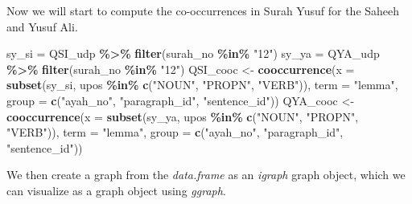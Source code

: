 \documentclass[
]{article}
\newenvironment{Shaded}{\begin{snugshade}}{\end{snugshade}}
\newcommand{\AttributeTok}[1]{\textcolor[rgb]{0.13,0.29,0.53}{#1}}
\newcommand{\FunctionTok}[1]{\textcolor[rgb]{0.13,0.29,0.53}{\textbf{#1}}}
\newcommand{\NormalTok}[1]{#1}
\newcommand{\OtherTok}[1]{\textcolor[rgb]{0.56,0.35,0.01}{#1}}
\newcommand{\SpecialCharTok}[1]{\textcolor[rgb]{0.81,0.36,0.00}{\textbf{#1}}}
\newcommand{\StringTok}[1]{\textcolor[rgb]{0.31,0.60,0.02}{#1}}
\begin{document}
Now we will start to compute the co-occurrences in Surah Yusuf for the Saheeh and Yusuf Ali.

\footnotesize

\begin{Shaded}
\begin{Highlighting}[]
\NormalTok{sy\_si }\OtherTok{=}\NormalTok{ QSI\_udp }\SpecialCharTok{\%\textgreater{}\%} \FunctionTok{filter}\NormalTok{(surah\_no }\SpecialCharTok{\%in\%} \StringTok{"12"}\NormalTok{)}
\NormalTok{sy\_ya }\OtherTok{=}\NormalTok{ QYA\_udp }\SpecialCharTok{\%\textgreater{}\%} \FunctionTok{filter}\NormalTok{(surah\_no }\SpecialCharTok{\%in\%} \StringTok{"12"}\NormalTok{)}
\NormalTok{QSI\_cooc }\OtherTok{\textless{}{-}} \FunctionTok{cooccurrence}\NormalTok{(}\AttributeTok{x =} \FunctionTok{subset}\NormalTok{(sy\_si, upos }\SpecialCharTok{\%in\%} \FunctionTok{c}\NormalTok{(}\StringTok{"NOUN"}\NormalTok{, }\StringTok{"PROPN"}\NormalTok{, }\StringTok{"VERB"}\NormalTok{)), }
                     \AttributeTok{term =} \StringTok{"lemma"}\NormalTok{, }
                     \AttributeTok{group =} \FunctionTok{c}\NormalTok{(}\StringTok{"ayah\_no"}\NormalTok{, }\StringTok{"paragraph\_id"}\NormalTok{, }\StringTok{"sentence\_id"}\NormalTok{))}
\NormalTok{QYA\_cooc }\OtherTok{\textless{}{-}} \FunctionTok{cooccurrence}\NormalTok{(}\AttributeTok{x =} \FunctionTok{subset}\NormalTok{(sy\_ya, upos }\SpecialCharTok{\%in\%} \FunctionTok{c}\NormalTok{(}\StringTok{"NOUN"}\NormalTok{, }\StringTok{"PROPN"}\NormalTok{, }\StringTok{"VERB"}\NormalTok{)), }
                     \AttributeTok{term =} \StringTok{"lemma"}\NormalTok{, }
                     \AttributeTok{group =} \FunctionTok{c}\NormalTok{(}\StringTok{"ayah\_no"}\NormalTok{, }\StringTok{"paragraph\_id"}\NormalTok{, }\StringTok{"sentence\_id"}\NormalTok{))}
\end{Highlighting}
\end{Shaded}

\normalsize

We then create a graph from the \emph{data.frame} as an \emph{igraph} graph object, which we can visualize as a graph object using \emph{ggraph}.

\footnotesize
\end{document}
